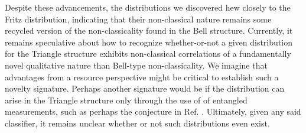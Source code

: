 \documentclass[aps, 10pt, english, twoside, pra, nofootinbib, tightenlines, longbibliography, superscriptaddress]{revtex4-1}
\begin{document}


    Despite these advancements, the distributions we discovered hew closely to the Fritz distribution, indicating that their non-classical nature remains some recycled version of the non-classicality found in the Bell structure. Currently, it remains speculative about how to recognize whether-or-not a given distribution for the Triangle structure exhibits non-classical correlations of a fundamentally novel qualitative nature than Bell-type non-classicality. We imagine that advantages from a resource perspective might be critical to establish such a novelty signature.
    Perhaps another signature would be if the distribution can arise in the Triangle structure only through the use of of entangled measurements, such as perhaps the conjecture in Ref. \cite{Gisin_2017}. Ultimately, given any said classifier, it remains unclear whether or not such distributions even exist.
\end{document}
